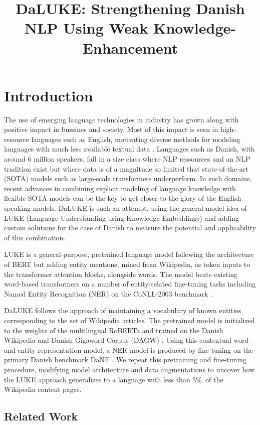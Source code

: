 \documentclass[10pt, a4paper]{article}
\title{DaLUKE: Strengthening Danish NLP Using Weak Knowledge-Enhancement}
\begin{document}
\maketitleabstract

\section{Introduction}
The use of emerging language technologies in industry has grown along with positive impact in bussines and society. 
Most of this impact is seen in high-resource languages such as English, motivating diverse methods for modeling languages with much less available textual data \cite{hedderich2021survey}.
Languages such as Danish, with around 6 million speakers, fall in a size class where NLP ressources and an NLP tradition exist but where data is of a magnitude so limited that state-of-the-art (SOTA) models such as large-scale transformers underperform.
In such domains, recent advances in combining explicit modeling of language knowledge with flexible SOTA models can be the key to get closer to the glory of the English-speaking models.
DaLUKE is such an attempt, using the general model idea of LUKE (Language Understanding using Knowledge Embeddings) \cite{yamada2020luke} and adding custom solutions for the case of Danish to measure the potential and applicability of this combination.

LUKE is a general-purpose, pretrained language model following the architecture of BERT but adding entity mentions, mined from Wikipedia, as token inputs to the transformer attention blocks, alongside words.
The model beats existing word-based transformers on a number of entity-related fine-tuning tasks including Named Entity Recognition (NER) on the CoNLL-2003 benchmark \cite{yamada2020luke,tjang2003conll}.

DaLUKE follows the approach of maintaining a vocabulary of known entities corresponding to the set of Wikipedia articles.
The pretrained model is initialized to the weights of the multilingual RoBERTa \cite{conneau2020unsupervised} and trained on the Danish Wikipedia and Danish Gigaword Corpus (DAGW) \cite{derc2021giga}.
Using this contextual word and entity representation model, a NER model is produced by fine-tuning on the primary Danish benchmark DaNE \cite{hvingelby2020dane}.
We repeat this pretraining and fine-tuning procedure, modifying model architecture and data augmentations to uncover how the LUKE approach generalizes to a language with less than 5\%\ of the Wikipedia content pages.

\subsection{Related Work}
\end{document}

